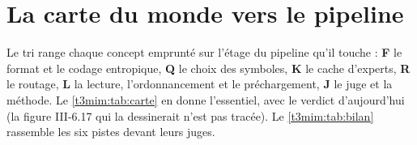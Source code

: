 \section{La carte du monde vers le pipeline}\label{t3mim:sec:carte}

Le tri range chaque concept emprunté sur l'étage du pipeline qu'il touche : \textbf{F} le format et le codage entropique, \textbf{Q} le choix des symboles, \textbf{K} le cache d'experts, \textbf{R} le routage, \textbf{L} la lecture, l'ordonnancement et le préchargement, \textbf{J} le juge et la méthode. Le \cref{t3mim:tab:carte} en donne l'essentiel, avec le verdict d'aujourd'hui (la figure III-6.17 qui la dessinerait n'est pas tracée). Le \cref{t3mim:tab:bilan} rassemble les six pistes devant leurs juges.

